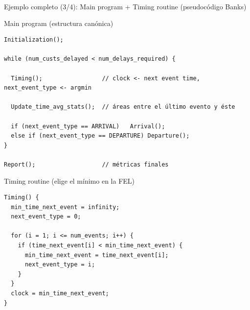 \documentclass[aspectratio=1610, 9pt]{beamer}
\begin{document}
\begin{frame}[fragile]{Ejemplo completo (3/4): Main program + Timing routine (pseudocódigo Banks)}
\small
\begin{block}{Main program (estructura canónica)}
\end{block}
\begin{verbatim}
Initialization();

while (num_custs_delayed < num_delays_required) {

  Timing();                 // clock <- next event time, next_event_type <- argmin

  Update_time_avg_stats();  // áreas entre el último evento y éste

  if (next_event_type == ARRIVAL)   Arrival();
  else if (next_event_type == DEPARTURE) Departure();
}

Report();                   // métricas finales
\end{verbatim}

\vspace{2pt}
\begin{block}{Timing routine (elige el mínimo en la FEL)}
\end{block}
\begin{verbatim}
Timing() {
  min_time_next_event = infinity;
  next_event_type = 0;

  for (i = 1; i <= num_events; i++) {
    if (time_next_event[i] < min_time_next_event) {
      min_time_next_event = time_next_event[i];
      next_event_type = i;
    }
  }
  clock = min_time_next_event;
}
\end{verbatim}
\end{frame}
\end{document}
